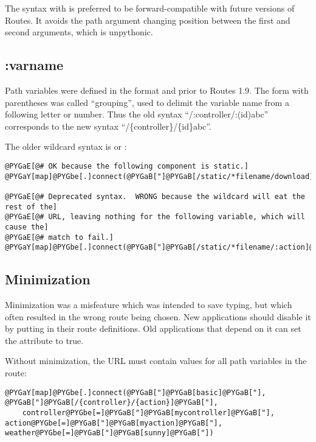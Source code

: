 \documentclass[letterpaper,10pt,english]{manual}
\begin{document}
The syntax with  is preferred to be forward-compatible with future
versions of Routes.  It avoids the path argument changing position between
the first and second arguments, which is unpythonic.


\subsection{:varname}

Path variables were defined in the format  and 
prior to Routes 1.9.  The form with parentheses was called ``grouping'', used
to delimit the variable name from a following letter or number.  Thus the old
syntax ``/:controller/:(id)abc'' corresponds to the new syntax
``/\{controller\}/\{id\}abc''.

The older wildcard syntax is  or :

\begin{Verbatim}[commandchars=@\[\]]
@PYGaE[@# OK because the following component is static.]
@PYGaY[map]@PYGbe[.]connect(@PYGaB["]@PYGaB[/static/*filename/download]@PYGaB["])

@PYGaE[@# Deprecated syntax.  WRONG because the wildcard will eat the rest of the]
@PYGaE[@# URL, leaving nothing for the following variable, which will cause the]
@PYGaE[@# match to fail.]
@PYGaY[map]@PYGbe[.]connect(@PYGaB["]@PYGaB[/static/*filename/:action]@PYGaB["])
\end{Verbatim}


\subsection{Minimization}

Minimization was a misfeature which was intended to save typing, but which
often resulted in the wrong route being chosen.  New applications should
disable it by putting  in their route definitions.
Old applications that depend on it can set the attribute to true.

Without minimization, the URL must contain values for all path variables in
the route:

\begin{Verbatim}[commandchars=@\[\]]
@PYGaY[map]@PYGbe[.]connect(@PYGaB["]@PYGaB[basic]@PYGaB["], @PYGaB["]@PYGaB[/{controller}/{action}]@PYGaB["],
    controller@PYGbe[=]@PYGaB["]@PYGaB[mycontroller]@PYGaB["], action@PYGbe[=]@PYGaB["]@PYGaB[myaction]@PYGaB["], weather@PYGbe[=]@PYGaB["]@PYGaB[sunny]@PYGaB["])
\end{Verbatim}
\end{document}
